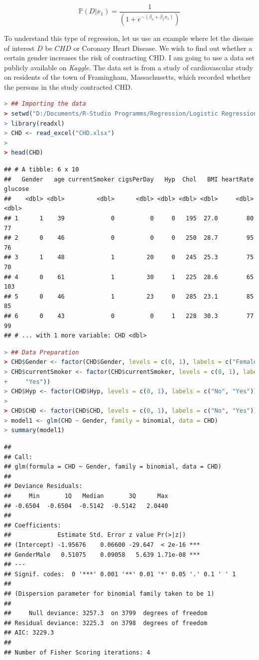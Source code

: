 \documentclass[
]{article}
\begin{document}
\[\mathbb{P}(D|x_1)=\frac{1}{(1+e^{-(\beta_o+\beta_1x_1)})}\]

To understand this type of regression, let us use an example where let
the disease of interest \(D\) be \(CHD\) or Coronary Heart Disease. We
wish to find out whether a certain gender increases the risk of
contracting CHD. I am going to use a data set publicly available on
\emph{Kaggle}. The data set is from a study of cardiovascular study on
residents of the town of Framingham, Massachusetts, which recorded
whether the persons in the study contracted CHD.

\begin{lstlisting}[language=R]
> ## Importing the data
> setwd("D:/Documents/R-Studio Programms/Regression/Logistic Regression")
> library(readxl)
> CHD <- read_excel("CHD.xlsx")
> 
> head(CHD)
\end{lstlisting}

\begin{lstlisting}
## # A tibble: 6 x 10
##   Gender   age currentSmoker cigsPerDay   Hyp  Chol   BMI heartRate glucose
##    <dbl> <dbl>         <dbl>      <dbl> <dbl> <dbl> <dbl>     <dbl>   <dbl>
## 1      1    39             0          0     0   195  27.0        80      77
## 2      0    46             0          0     0   250  28.7        95      76
## 3      1    48             1         20     0   245  25.3        75      70
## 4      0    61             1         30     1   225  28.6        65     103
## 5      0    46             1         23     0   285  23.1        85      85
## 6      0    43             0          0     1   228  30.3        77      99
## # ... with 1 more variable: CHD <dbl>
\end{lstlisting}

\begin{lstlisting}[language=R]
> ## Data Preparation
> CHD$Gender <- factor(CHD$Gender, levels = c(0, 1), labels = c("Female", "Male"))
> CHD$currentSmoker <- factor(CHD$currentSmoker, levels = c(0, 1), labels = c("No",
+     "Yes"))
> CHD$Hyp <- factor(CHD$Hyp, levels = c(0, 1), labels = c("No", "Yes"))
> 
> CHD$CHD <- factor(CHD$CHD, levels = c(0, 1), labels = c("No", "Yes"))
> model1 <- glm(CHD ~ Gender, family = binomial, data = CHD)
> summary(model1)
\end{lstlisting}

\begin{lstlisting}
## 
## Call:
## glm(formula = CHD ~ Gender, family = binomial, data = CHD)
## 
## Deviance Residuals: 
##     Min       1Q   Median       3Q      Max  
## -0.6504  -0.6504  -0.5142  -0.5142   2.0440  
## 
## Coefficients:
##             Estimate Std. Error z value Pr(>|z|)    
## (Intercept) -1.95676    0.06600 -29.647  < 2e-16 ***
## GenderMale   0.51075    0.09058   5.639 1.71e-08 ***
## ---
## Signif. codes:  0 '***' 0.001 '**' 0.01 '*' 0.05 '.' 0.1 ' ' 1
## 
## (Dispersion parameter for binomial family taken to be 1)
## 
##     Null deviance: 3257.3  on 3799  degrees of freedom
## Residual deviance: 3225.3  on 3798  degrees of freedom
## AIC: 3229.3
## 
## Number of Fisher Scoring iterations: 4
\end{lstlisting}
\end{document}
